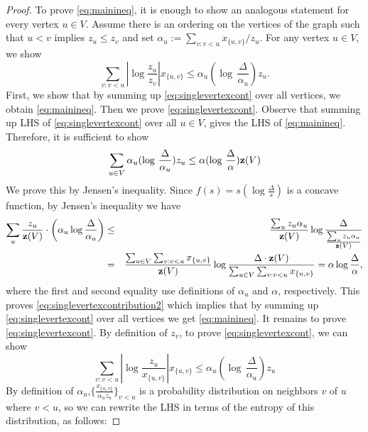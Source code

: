 \documentclass[11pt]{article}
\def\bz{{\bf z}}
\begin{document}
\begin{proof}
To prove \eqref{eq:mainineq}, it is enough to show an analogous 
statement for  every vertex $u \in V$. Assume there is an ordering on the vertices of the graph such that $u < v$ implies $z_u \leq z_v$ and set $\alpha_u :=\sum_{v: 
v < u} x_{\{u,v\}}/z_u$. For any vertex $u \in V$, we show  
\begin{equation}
\label{eq:singlevertexcont}
\sum_{v: v  < u}\left|   \log \frac {z_u}{ z_v}\right|
x_{\{u,v\}}  \leq \alpha_u(\log \, \frac{\Delta}{\alpha_u}) z_u. 
\end{equation}
First, we show that by summing up \eqref{eq:singlevertexcont} over all vertices, we obtain \eqref{eq:mainineq}. Then we prove \eqref{eq:singlevertexcont}. Observe that summing up LHS of \eqref{eq:singlevertexcont} over all $u \in V$, gives the LHS of \eqref{eq:mainineq}. Therefore, it is sufficient to show 
\begin{equation}
\label{eq:singlevertexcontribution2}
\sum_{u \in V} \alpha_u(\log \, \frac{\Delta}{\alpha_u}) z_u \leq 
\alpha(\log \, \frac{\Delta}{\alpha}) \bz(V)
\end{equation}
We prove this by Jensen's inequality.
Since $f(s)= s (\log \frac{\Delta}{s})$ is a concave function, by Jensen's inequality we have  \\
\begin{eqnarray*}
\sum_{u} \frac{z_u}{\bz(V)}\cdot\left(\alpha_u \log \frac{\Delta}{\alpha_u} \right) &\leq & \frac{\sum_u z_u \alpha_u}{\bz(V)}\log \frac{\Delta}{\frac{\sum_u z_u \alpha_u}{\bz(V)}}\\  &=& 
\frac{\sum_{ u \in V} \sum_{v: v< u} x_{\{u,v\}}}{\bz(V)} \log \frac{\Delta \cdot \bz(V)}{\sum_{ u \in V} \sum_{v:  v< u} x_{\{u,v\}}} =   \alpha \log \frac{\Delta}{\alpha},
\end{eqnarray*}
where the first and second equality use definitions of $\alpha_u$ and $\alpha$, respectively. This proves \eqref{eq:singlevertexcontribution2} which implies that by summing up \eqref{eq:singlevertexcont} over all vertices we get \eqref{eq:mainineq}. It remains to prove \eqref{eq:singlevertexcont}. By definition of $z_v$, to prove  \eqref{eq:singlevertexcont}, we can show \\
\begin{equation*}
\sum_{v: v  < u}\left|   \log \frac {z_u}{ x_{\{u,v\}}}\right|x_{\{u,v\}} \leq \alpha_u(\log \, \frac{\Delta}{\alpha_u}) z_u
\end{equation*}
By definition of $\alpha_u$,$\{\frac{x_{\{u,v\}}}{\alpha_u z_u}\}_{v<u}$ is a probability distribution on neighbors $v$ of $u$ where $v<u$, so we can rewrite the LHS in terms of the entropy of this distribution, as follows: 

\end{proof}
\end{document}
